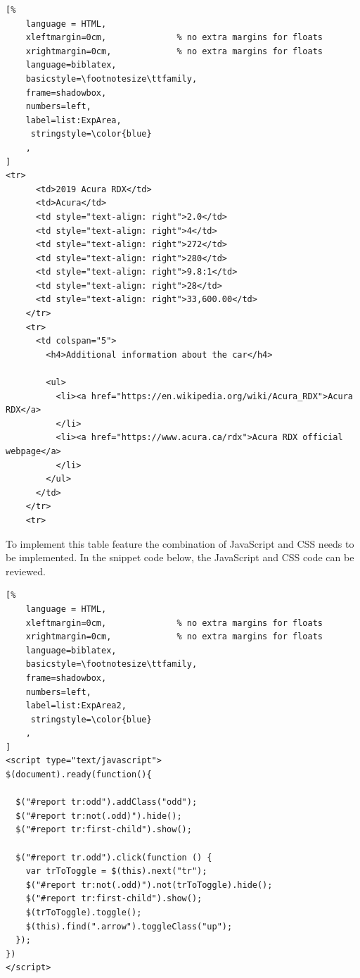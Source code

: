 \begin{lstlisting}[%
    language = HTML,
    xleftmargin=0cm,              % no extra margins for floats
    xrightmargin=0cm,             % no extra margins for floats
    language=biblatex,
    basicstyle=\footnotesize\ttfamily,
    frame=shadowbox,
    numbers=left,
    label=list:ExpArea,
     stringstyle=\color{blue}
    ,
]
<tr>
      <td>2019 Acura RDX</td>
      <td>Acura</td>
      <td style="text-align: right">2.0</td>
      <td style="text-align: right">4</td>
      <td style="text-align: right">272</td>
      <td style="text-align: right">280</td>
      <td style="text-align: right">9.8:1</td>
      <td style="text-align: right">28</td>
      <td style="text-align: right">33,600.00</td>
    </tr>
    <tr>
      <td colspan="5">
        <h4>Additional information about the car</h4>

        <ul>
          <li><a href="https://en.wikipedia.org/wiki/Acura_RDX">Acura RDX</a>
          </li>
          <li><a href="https://www.acura.ca/rdx">Acura RDX official webpage</a>
          </li>
        </ul>
      </td>
    </tr>
    <tr>
\end{lstlisting}
To implement this table feature the combination of JavaScript and
CSS needs to be implemented. In the snippet code below, the JavaScript and CSS code can be reviewed.

\begin{lstlisting}[%
    language = HTML,
    xleftmargin=0cm,              % no extra margins for floats
    xrightmargin=0cm,             % no extra margins for floats
    language=biblatex,
    basicstyle=\footnotesize\ttfamily,
    frame=shadowbox,
    numbers=left,
    label=list:ExpArea2,
     stringstyle=\color{blue}
    ,
]
<script type="text/javascript">
$(document).ready(function(){

  $("#report tr:odd").addClass("odd");
  $("#report tr:not(.odd)").hide();
  $("#report tr:first-child").show();

  $("#report tr.odd").click(function () {
    var trToToggle = $(this).next("tr");
    $("#report tr:not(.odd)").not(trToToggle).hide();
    $("#report tr:first-child").show();
    $(trToToggle).toggle();
    $(this).find(".arrow").toggleClass("up");
  });
})
</script>

\end{lstlisting}

